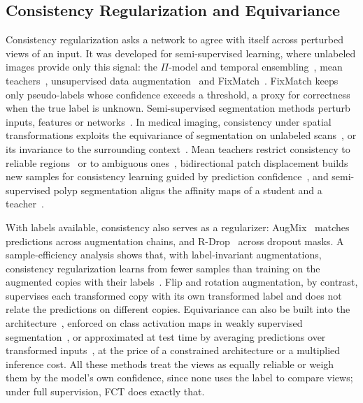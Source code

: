 \subsection{Consistency Regularization and Equivariance}

Consistency regularization asks a network to agree with itself across perturbed views of an
input. It was developed for semi-supervised learning, where unlabeled images provide only this
signal: the $\Pi$-model and temporal ensembling~\cite{laine2017temporal}, mean
teachers~\cite{tarvainen2017mean}, unsupervised data augmentation~\cite{xie2020uda} and
FixMatch~\cite{sohn2020fixmatch}. FixMatch keeps only pseudo-labels whose confidence exceeds a
threshold, a proxy for correctness when the true label is unknown. Semi-supervised segmentation
methods perturb inputs, features or networks~\cite{ouali2020cct,chen2021cps,yang2023unimatch}.
In medical imaging, consistency under spatial transformations exploits the equivariance of
segmentation on unlabeled scans~\cite{bortsova2019consistency,li2021tcsm}, or its invariance to
the surrounding context~\cite{liu2025tracoco}. Mean teachers restrict consistency to reliable
regions~\cite{yu2019uamt} or to ambiguous ones~\cite{xu2023acmt}, bidirectional patch displacement
builds new samples for consistency learning guided by prediction confidence~\cite{chi2024abd}, and
semi-supervised polyp segmentation aligns the affinity maps of a student and a
teacher~\cite{wu2023aclnet}.

With labels available, consistency also serves as a regularizer: AugMix~\cite{hendrycks2020augmix}
matches predictions across augmentation chains, and R-Drop~\cite{liang2021rdrop} across dropout
masks. A sample-efficiency analysis shows that, with label-invariant augmentations, consistency
regularization learns from fewer samples than training on the augmented copies with their
labels~\cite{yang2023dac}. Flip and rotation augmentation, by contrast, supervises each transformed copy with its own
transformed label and does not relate the predictions on different copies. Equivariance can also
be built into the architecture~\cite{cohen2016gcnn,veeling2018rotation}, enforced on class
activation maps in weakly supervised segmentation~\cite{wang2020seam}, or approximated at test
time by averaging predictions over transformed inputs~\cite{wang2019tta}, at the price of a
constrained architecture or a multiplied inference cost. All these methods treat the views as
equally reliable or weigh them by the model's own confidence, since none uses the label to
compare views; under full supervision, FCT does exactly that.

